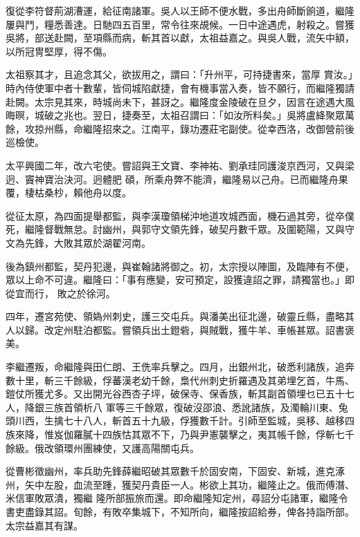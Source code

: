\begin{pinyinscope}
 復從李符督荊湖漕運，給征南諸軍。吳人以王師不便水戰，多出舟師斷餉道，繼隆屢與鬥，糧悉善達。日馳四五百里，常令往來覘候。一日中途遇虎，射殺之。嘗獲吳將，部送赴闕，至項縣而病，斬其首以獻，太祖益嘉之。與吳人戰，流矢中額，以所冠冑堅厚，得不傷。



 太祖察其才，且追念其父，欲拔用之，謂曰：「升州平，可持捷書來，當厚
 賞汝。」時內侍使軍中者十數輩，皆伺城陷獻捷，會有機事當入奏，皆不願行，而繼隆獨請赴闕。太宗見其來，時城尚未下，甚訝之。繼隆度金陵破在旦夕，因言在途遇大風晦暝，城破之兆也。翌日，捷奏至，太祖召謂曰：「如汝所料矣。」吳將盧絳聚眾萬餘，攻掠州縣，命繼隆招來之。江南平，錄功遷莊宅副使。從幸西洛，改御營前後巡檢使。



 太平興國二年，改六宅使。嘗詔與王文寶、李神祐、劉承珪同護浚京西河，又與梁迥、竇神寶治決河。迥體肥
 碩，所乘舟弊不能濟，繼隆易以己舟。已而繼隆舟果覆，棲枯桑杪，賴他舟以度。



 從征太原，為四面提舉都監，與李漢瓊領梯沖地道攻城西面，機石過其旁，從卒僕死，繼隆督戰無怠。討幽州，與郭守文領先鋒，破契丹數千眾。及圍範陽，又與守文為先鋒，大敗其眾於湖翟河南。



 後為鎮州都監，契丹犯邊，與崔翰諸將御之。初，太宗授以陣圖，及臨陣有不便，眾以上命不可違。繼隆曰：「事有應變，安可預定，設獲違詔之罪，請獨當也。」即從宜而行，
 敗之於徐河。



 四年，遷宮苑使、領媯州刺史，護三交屯兵。與潘美出征北邊，破靈丘縣，盡略其人以歸。改定州駐泊都監。嘗領兵出土鐙砦，與賊戰，獲牛羊、車帳甚眾。詔書褒美。



 李繼遷叛，命繼隆與田仁朗、王侁率兵擊之。四月，出銀州北，破悉利諸族，追奔數十里，斬三千餘級，俘蕃漢老幼千餘，梟代州刺史折羅遇及其弟埋乞首，牛馬、鎧仗所獲尤多。又出開光谷西杏子坪，破保寺、保香族，斬其副首領埋乜已五十七人，降銀三族首領析八
 軍等三千餘眾，復破沒邵浪、悉訛諸族，及濁輪川東、兔頭川西，生擒七十八人，斬首五十九級，俘獲數千計。引師至監城，吳移、越移四族來降，惟岌伽羅膩十四族怙其眾不下，乃與尹憲襲擊之，夷其帳千餘，俘斬七千餘級。俄改領環州團練使，又護高陽關屯兵。



 從曹彬徵幽州，率兵助先鋒薛繼昭破其眾數千於固安南，下固安、新城，進克涿州，矢中左股，血流至踵，獲契丹貴臣一人。彬欲上其功，繼隆止之。俄而傅潛、米信軍敗眾潰，獨繼
 隆所部振旅而還。即命繼隆知定州，尋詔分屯諸軍，繼隆令書吏盡錄其詔。旬餘，有敗卒集城下，不知所向，繼隆按詔給券，俾各持詣所部。太宗益嘉其有謀。




\end{pinyinscope}
